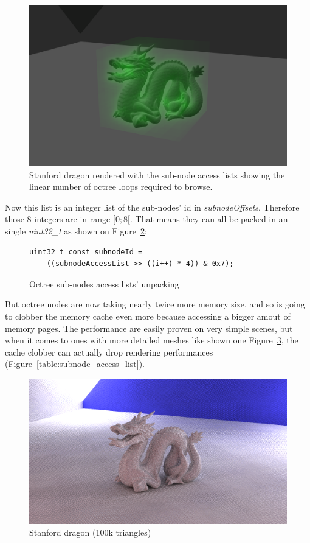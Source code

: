 \begin{figure}[h]
    \centering
    \includegraphics[width=0.8\columnwidth]{stats_octree_loops_optimized.png}
    \caption{
        Stanford dragon rendered with the sub-node access lists showing
        the linear number of octree loops required to browse.
    }
    \label{fig:stanford_dragon_with_access_list}
\end{figure}

Now this list is an integer list of the sub-nodes' id in
\textit{subnodeOffsets}. Therefore those 8 integers are in range $[0;8[$. That
means they can all be packed in an single \textit{uint32\_t} as shown on
Figure~\ref{code:subnode_access_unpacking}:

\begin{figure}[H]
    \centering
    \begin{lstlisting}[morekeywords={uint32_t}]
uint32_t const subnodeId =
    ((subnodeAccessList >> ((i++) * 4)) & 0x7);
    \end{lstlisting}
    \caption{Octree sub-nodes access lists' unpacking}
    \label{code:subnode_access_unpacking}
\end{figure}

But octree nodes are now taking nearly twice more memory size, and so is going
to clobber the memory cache even more because accessing a bigger amout of
memory pages. The performance are easily proven on very simple scenes, but when it comes
to ones with more detailed meshes like shown one Figure~\ref{fig:stanford_dragon}, the cache
clobber can actually drop rendering performances (Figure~\ref{table:subnode_access_list}).

\begin{figure}[h]
    \centering
    \includegraphics[width=0.8\columnwidth]{render_stanford_dragon.png}
    \caption{Stanford dragon (100k triangles)}
    \label{fig:stanford_dragon}
\end{figure}


